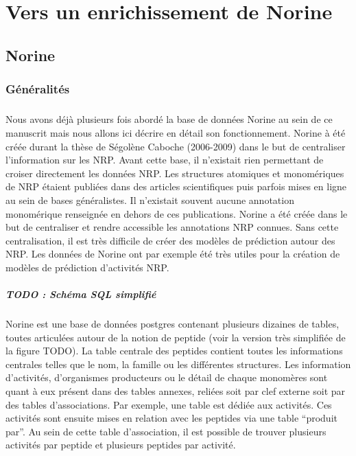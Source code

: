 \documentclass[12pt,french,twoside]{report}
\begin{document}
\chapter{Vers un enrichissement de Norine}

\section{Norine}

\subsection{Généralités}

\paragraph{}Nous avons déjà plusieurs fois abordé la base de données Norine au sein de ce manuscrit mais nous allons ici décrire en détail son fonctionnement.
Norine à été créée durant la thèse de Ségolène Caboche (2006-2009) dans le but de centraliser l'information sur les NRP.
Avant cette base, il n'existait rien permettant de croiser directement les données NRP.
Les structures atomiques et monomériques de NRP étaient publiées dans des articles scientifiques puis parfois mises en ligne au sein de bases généralistes.
Il n'existait souvent aucune annotation monomérique renseignée en dehors de ces publications.
Norine a été créée dans le but de centraliser et rendre accessible les annotations NRP connues.
Sans cette centralisation, il est très difficile de créer des modèles de prédiction autour des NRP.
Les données de Norine ont par exemple été très utiles pour la création de modèles de prédiction d'activités NRP.

\paragraph{TODO : Schéma SQL simplifié}

\paragraph{}Norine est une base de données postgres contenant plusieurs dizaines de tables, toutes articulées autour de la notion de peptide (voir la version très simplifiée de la figure TODO).
La table centrale des peptides contient toutes les informations centrales telles que le nom, la famille ou les différentes structures.
Les information d'activités, d'organismes producteurs ou le détail de chaque monomères sont quant à eux présent dans des tables annexes, reliées soit par clef externe soit par des tables d'associations.
Par exemple, une table est dédiée aux activités.
Ces activités sont ensuite mises en relation avec les peptides via une table ``produit par''.
Au sein de cette table d'association, il est possible de trouver plusieurs activités par peptide et plusieurs peptides par activité.
\end{document}
